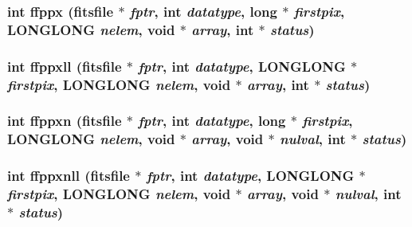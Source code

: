 \subsubsection{\setlength{\rightskip}{0pt plus 5cm}int ffppx (\bf{fitsfile} $\ast$ {\em fptr}, int {\em datatype}, long $\ast$ {\em firstpix}, \bf{LONGLONG} {\em nelem}, void $\ast$ {\em array}, int $\ast$ {\em status})}\label{test_2roimasker_2fitsio_8h_9a545226811c5df0f85e0bd4c98f0f95}


\subsubsection{\setlength{\rightskip}{0pt plus 5cm}int ffppxll (\bf{fitsfile} $\ast$ {\em fptr}, int {\em datatype}, \bf{LONGLONG} $\ast$ {\em firstpix}, \bf{LONGLONG} {\em nelem}, void $\ast$ {\em array}, int $\ast$ {\em status})}\label{test_2roimasker_2fitsio_8h_a5a52d455af81ac3c3ea32e15ce790fe}


\subsubsection{\setlength{\rightskip}{0pt plus 5cm}int ffppxn (\bf{fitsfile} $\ast$ {\em fptr}, int {\em datatype}, long $\ast$ {\em firstpix}, \bf{LONGLONG} {\em nelem}, void $\ast$ {\em array}, void $\ast$ {\em nulval}, int $\ast$ {\em status})}\label{test_2roimasker_2fitsio_8h_2ff55dfbe37f1ecf48227480629dc956}


\subsubsection{\setlength{\rightskip}{0pt plus 5cm}int ffppxnll (\bf{fitsfile} $\ast$ {\em fptr}, int {\em datatype}, \bf{LONGLONG} $\ast$ {\em firstpix}, \bf{LONGLONG} {\em nelem}, void $\ast$ {\em array}, void $\ast$ {\em nulval}, int $\ast$ {\em status})}\label{test_2roimasker_2fitsio_8h_a46e0229ce53eaeb3e024daff7cda152}


